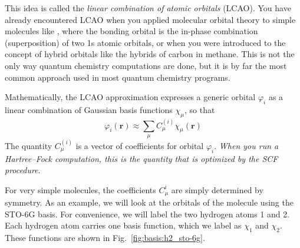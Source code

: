 \documentclass[../Main/chem371-notes.tex]{subfiles}
\begin{document}
This idea is called the \emph{linear combination of atomic orbitals} (LCAO).
You have already encountered LCAO when you applied molecular orbital theory to simple molecules like , where the bonding orbital is the in-phase combination (superposition) of two 1s atomic orbitals, or when you were introduced to the concept of hybrid orbitals like the  hybrids of carbon in methane.
This is not the only way quantum chemistry computations are done, but it is by far the most common approach used in most quantum chemistry programs.

Mathematically, the LCAO approximation expresses a generic orbital $\varphi_i$ as a linear combination of Gaussian basis functions $\chi_\mu$, so that
\begin{equation} \label{eq:basis:orb}
\varphi_i(\mathbf{r}) \approx \sum_\mu C_{\mu}^{(i)}\chi_\mu(\mathbf{r})
\end{equation}
The quantity $C_{\mu}^{(i)}$ is a vector of coefficients for orbital $\varphi_i$.
\emph{When you run a Hartree--Fock computation, this is the quantity that is optimized by the SCF procedure}.

For very simple molecules, the coefficients $C_{\mu}^i$ are simply determined by symmetry.
As an example, we will look at the orbitals of the  molecule using the STO-6G basis.
For convenience, we will label the two hydrogen atoms 1 and 2.
Each hydrogen atom carries one basis function, which we label as $\chi_1$ and $\chi_2$. These functions are shown in Fig.~\ref{fig:basis:h2_sto-6g}.	
\end{document}
